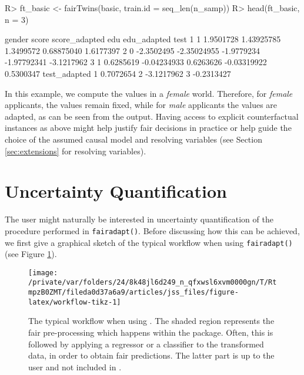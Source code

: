 \documentclass[
  nojss]{jss}
\begin{document}
\begin{CodeChunk}
\begin{CodeInput}
R> ft_basic <- fairTwins(basic, train.id = seq_len(n_samp))
R> head(ft_basic, n = 3)
\end{CodeInput}
\begin{CodeOutput}
  gender      score score_adapted        edu edu_adapted       test
1      1  1.9501728    1.43925785  1.3499572  0.68875040  1.6177397
2      0 -2.3502495   -2.35024955 -1.9779234 -1.97792341 -3.1217962
3      1  0.6285619   -0.04234933  0.6263626 -0.03319922  0.5300347
  test_adapted
1    0.7072654
2   -3.1217962
3   -0.2313427
\end{CodeOutput}
\end{CodeChunk}

In this example, we compute the values in a \emph{female} world.
Therefore, for \emph{female} applicants, the values remain fixed, while
for \emph{male} applicants the values are adapted, as can be seen from
the output. Having access to explicit counterfactual instances as above
might help justify fair decisions in practice or help guide the choice
of the assumed causal model and resolving variables (see Section
\ref{sec:extensions} for resolving variables).

\hypertarget{sec:uncq}{%
\section{Uncertainty Quantification}\label{sec:uncq}}

The user might naturally be interested in uncertainty quantification of
the procedure performed in \texttt{fairadapt()}. Before discussing how
this can be achieved, we first give a graphical sketch of the typical
workflow when using \texttt{fairadapt()} (see Figure
\ref{fig:workflow-tikz}).

\begin{CodeChunk}
\begin{figure}

{\centering \texttt{[image: /private/var/folders/24/8k48jl6d249\_n\_qfxwsl6xvm0000gn/T/RtmpzB0ZMT/fileda0d37a6a9/articles/jss\_files/figure-latex/workflow-tikz-1]} 

}

\caption{The typical workflow when using . The shaded region represents the fair pre-processing which happens within the  package. Often, this is followed by applying a regressor or a classifier to the transformed data, in order to obtain fair predictions. The latter part is up to the user and not included in .}\label{fig:workflow-tikz}
\end{figure}
\end{CodeChunk}
\end{document}
